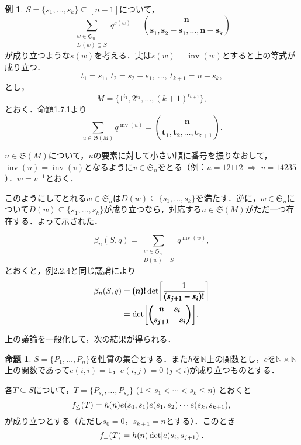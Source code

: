 \documentclass[xelatex,ja=standard,a4paper,14pt,everyparhook=compat]{bxjsarticle}
\newcommand{\bbN}{\mathbb{N}}
\newcommand{\fS}{\mathfrak{S}}
\newcommand{\qbinom}[2]{\pmb{\binom{#1}{#2}}}
\theoremstyle{definition}
\newtheorem{example}[theorem]{例}
\newtheorem{proposition}[theorem]{命題}
\begin{document}
\begin{example}
    $S = \{s_1, \ldots, s_k\} \subseteq [n-1]$について，
    \begin{equation*}
        \sum_{\substack{w \in \fS_n \\ D(w) \subseteq S}} q^{s(w)} = \qbinom{n}{s_1, s_2-s_1, \ldots, n-s_k}
    \end{equation*}
    が成り立つような$s(w)$を考える．実は$s(w)=\operatorname{inv}(w)$とすると上の等式が成り立つ． \begin{equation*}
        t_1 = s_1,\ t_2 = s_2 - s_1,\ \ldots,\ t_{k+1} = n - s_k,
    \end{equation*}
    とし， \begin{equation*}
        M = \{1^{t_1}, 2^{t_2}, \ldots, (k+1)^{t_{k+1}}\},
    \end{equation*}
    とおく．命題1.7.1より \begin{equation*}
        \sum_{u \in \fS(M)} q^{\operatorname{inv}(u)} = \qbinom{n}{t_1, t_2, \ldots, t_{k+1}}.
    \end{equation*}

    $u \in \fS(M)$について，$u$の要素に対して小さい順に番号を振りなおして，$\operatorname{inv}(u) = \operatorname{inv}(v)$となるように$v \in \fS_n$をとる（例：$u = 12112$ $\Rightarrow$ $v=14235$）．$w = v^{-1}$とおく．

    このようにしてとれる$w \in \fS_n$は$D(w) \subseteq \{s_1,\ldots,s_k\}$を満たす．逆に，$w \in \fS_n$について$D(w) \subseteq \{s_1,\ldots,s_k\}$が成り立つなら，対応する$u \in \fS(M)$がただ一つ存在する．よって示された．

    \begin{equation*}
        \beta_n(S, q) = \sum_{\substack{w \in \fS_n \\ D(w) = S}} q^{\operatorname{inv}(w)},
    \end{equation*}
    とおくと，例2.2.4と同じ議論により \begin{align*}
        \beta_n(S, q) &= \pmb{(n)!} \det \mleft[ \frac{1}{\pmb{(s_{j+1}-s_i)!}} \mright] \\
        &= \det \mleft[ \qbinom{n-s_i}{s_{j+1}-s_i} \mright].
    \end{align*}
\end{example}

上の議論を一般化して，次の結果が得られる．

\begin{proposition}
    $S = \{P_1,\ldots,P_n\}$を性質の集合とする．また$h$を$\bbN$上の関数とし，$e$を$\bbN \times \bbN$上の関数であって$e(i,i) = 1$，$e(i,j) = 0$ ($j < i$)が成り立つものとする．

    各$T \subseteq S$について，$T = \{P_{s_1}, \ldots, P_{s_k}\}$ ($1 \leq s_1 < \cdots < s_k \leq n$) とおくと \begin{equation*}
        f_\leq(T) = h(n) e(s_0,s_1) e(s_1,s_2) \cdots e(s_k,s_{k+1}), \\
    \end{equation*}
    が成り立つとする（ただし$s_0 = 0$，$s_{k+1} = n$とする）．このとき \begin{equation*}
        f_=(T) = h(n) \det \mleft[ e(s_i, s_{j+1}) \mright].
    \end{equation*}
\end{proposition}
\end{document}
